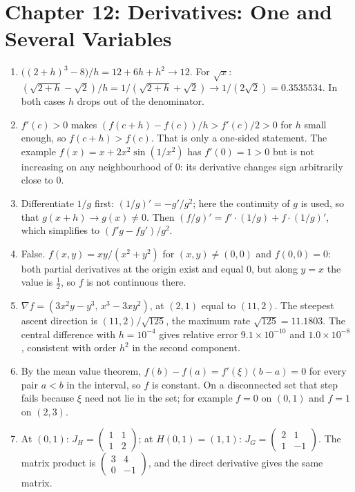 \section*{Chapter 12: Derivatives: One and Several Variables}
\begin{enumerate}[label=\textbf{12.\arabic*}]
  \item $\bigl((2+h)^{3}-8\bigr)/h=12+6h+h^{2}\to12$. For $\sqrt x$:
        $(\sqrt{2+h}-\sqrt2)/h=1/(\sqrt{2+h}+\sqrt2)\to1/(2\sqrt2)
        =0.3535534$. In both cases $h$ drops out of the denominator.

  \item $f'(c)>0$ makes $(f(c+h)-f(c))/h>f'(c)/2>0$ for $h$ small enough,
        so $f(c+h)>f(c)$. That is only a one-sided statement. The example
        $f(x)=x+2x^{2}\sin(1/x^{2})$ has $f'(0)=1>0$ but is not increasing on
        any neighbourhood of $0$: its derivative changes sign arbitrarily close
        to $0$.

  \item Differentiate $1/g$ first: $(1/g)'=-g'/g^{2}$; here the continuity of $g$
        is used, so that $g(x+h)\to g(x)\ne0$. Then
        $(f/g)'=f'\cdot(1/g)+f\cdot(1/g)'$, which simplifies to
        $(f'g-fg')/g^{2}$.

  \item False. $f(x,y)=xy/(x^{2}+y^{2})$ for $(x,y)\ne(0,0)$ and
        $f(0,0)=0$: both partial derivatives at the origin exist and equal $0$,
        but along $y=x$ the value is $\tfrac12$, so $f$ is not continuous
        there.

  \item $\nabla f=(3x^{2}y-y^{3},\,x^{3}-3xy^{2})$, at $(2,1)$ equal to
        $(11,2)$. The steepest ascent direction is $(11,2)/\sqrt{125}$, the maximum rate
        $\sqrt{125}=11.1803$. The central difference with $h=10^{-4}$ gives relative error
        $9.1\times10^{-10}$ and $1.0\times10^{-8}$, consistent with order $h^{2}$ in the
        second component.

  \item By the mean value theorem,
        $f(b)-f(a)=f'(\xi)(b-a)=0$ for every pair $a<b$ in the interval, so
        $f$ is constant. On a disconnected set that step fails because $\xi$
        need not lie in the set; for example $f=0$ on $(0,1)$ and $f=1$
        on $(2,3)$.

  \item At $(0,1)$: $J_{H}=\begin{pmatrix}1&1\\1&2\end{pmatrix}$; at
        $H(0,1)=(1,1)$: $J_{G}=\begin{pmatrix}2&1\\1&-1\end{pmatrix}$. The matrix
        product is $\begin{pmatrix}3&4\\0&-1\end{pmatrix}$, and the direct derivative
        gives the same matrix.


\end{enumerate}
